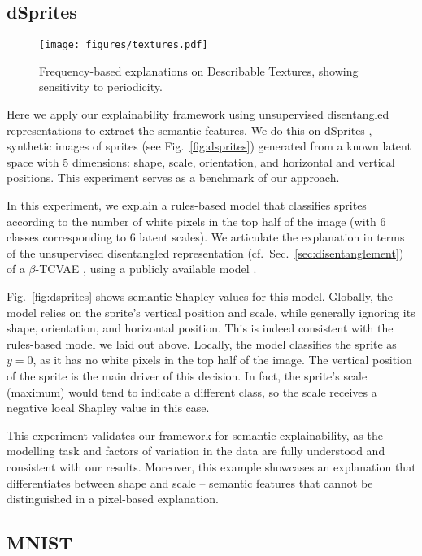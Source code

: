 \documentclass{article}
\DeclareRobustCommand{\Sec}[1]{Sec.~\ref{sec:#1}}
\DeclareRobustCommand{\Fig}[1]{Fig.~\ref{fig:#1}}
\begin{document}
\subsection{dSprites}
\label{sec:dsprites}


\begin{figure}[!t]
    \centering
    \texttt{[image: figures/textures.pdf]}
    \caption{Frequency-based explanations on Describable Textures, showing sensitivity to periodicity.}
    \label{fig:textures}
\end{figure}


Here we apply our explainability framework using unsupervised disentangled representations to extract the semantic features. We do this on dSprites \citep{dsprites17}, synthetic images of sprites (see \Fig{dsprites}) generated from a known latent space with 5 dimensions: shape, scale, orientation, and horizontal and vertical positions. This experiment serves as a benchmark of our approach.

In this experiment, we explain a rules-based model that classifies sprites according to the number of white pixels in the top half of the image (with 6 classes corresponding to 6 latent scales). We articulate the explanation in terms of the unsupervised disentangled representation (cf.~\Sec{disentanglement}) of a $\beta$-TCVAE \citep{Btcvae}, using a publicly available model \citep{yanndubs2019}.

\Fig{dsprites} shows semantic Shapley values for this model. Globally, the model relies on the sprite's vertical position and scale, while generally ignoring its shape, orientation, and horizontal position. This is indeed consistent with the rules-based model we laid out above. Locally, the model classifies the sprite as $y=0$, as it has no white pixels in the top half of the image. The vertical position of the sprite is the main driver of this decision. In fact, the sprite's scale (maximum) would tend to indicate a different class, so the scale receives a negative local Shapley value in this case. 

This experiment validates our framework for semantic explainability, as the modelling task and factors of variation in the data are fully understood and consistent with our results. Moreover, this example showcases an explanation that differentiates between shape and scale -- semantic features that cannot be distinguished in a pixel-based explanation.


\subsection{MNIST}
\label{sec:mnist}
\end{document}
